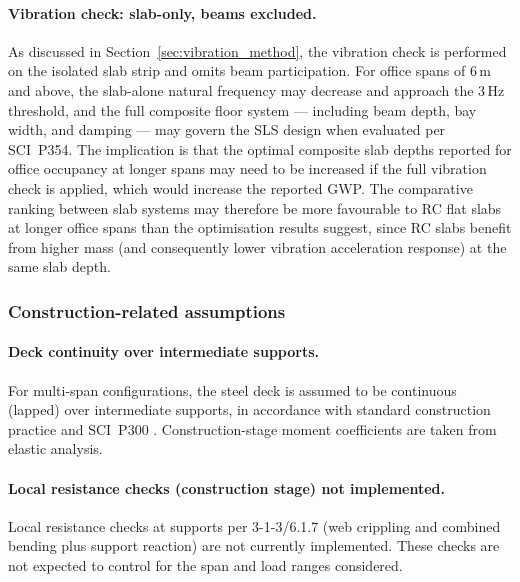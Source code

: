 \paragraph{Vibration check: slab-only, beams excluded.}
As discussed in Section~\ref{sec:vibration_method}, the vibration check is performed on the isolated slab strip and omits beam participation. For office spans of 6\,m and above, the slab-alone natural frequency may decrease and approach the 3\,Hz threshold, and the full composite floor system --- including beam depth, bay width, and damping --- may govern the SLS design when evaluated per SCI~P354. The implication is that the optimal composite slab depths reported for office occupancy at longer spans may need to be increased if the full vibration check is applied, which would increase the reported GWP. The comparative ranking between slab systems may therefore be more favourable to RC flat slabs at longer office spans than the optimisation results suggest, since RC slabs benefit from higher mass (and consequently lower vibration acceleration response) at the same slab depth.

\subsubsection*{Construction-related assumptions}

\paragraph{Deck continuity over intermediate supports.}
For multi-span configurations, the steel deck is assumed to be continuous (lapped) over intermediate supports, in accordance with standard construction practice and SCI~P300 \citep{RefWorks:scip300}. Construction-stage moment coefficients are taken from elastic analysis.

\paragraph{Local resistance checks (construction stage) not implemented.}
Local resistance checks at supports per 3-1-3/6.1.7 (web crippling and combined bending plus support reaction) are not currently implemented. These checks are not expected to control for the span and load ranges considered.

